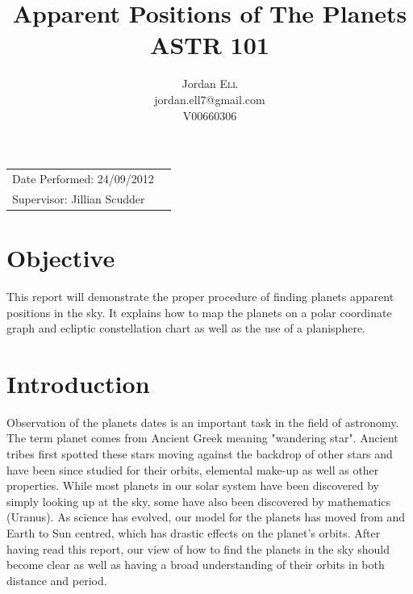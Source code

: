 \documentclass{article}
\title{Apparent Positions of The Planets \\ ASTR 101} %
\author{Jordan \textsc{Ell} \\ jordan.ell7@gmail.com \\ V00660306} %
\begin{document}
\maketitle %

\begin{tabular}{lr}
Date Performed: 24/09/2012 \\ %
Supervisor: Jillian Scudder %
\end{tabular}

\setlength\parindent{0pt} %

\renewcommand{\labelenumi}{\alph{enumi}.} %


\section{Objective}

This report will demonstrate the proper procedure of finding planets apparent positions in the sky.
It explains how to map the planets on a polar coordinate graph and ecliptic constellation chart as well as the 
use of a planisphere.\\
 

\section{Introduction}

Observation of the planets dates is an important task in the field of astronomy. The term planet comes from Ancient Greek
meaning "wandering star". Ancient tribes first spotted these stars moving against the backdrop of other stars and have been
since studied for their orbits, elemental make-up as well as other properties. While most planets in our solar system have been
discovered by simply looking up at the sky, some have also been discovered by mathematics (Uranus). As science has evolved,
our model for the planets has moved from and Earth to Sun centred, which has drastic effects on the planet's orbits. After having
read this report, our view of how to find the planets in the sky should become clear as well as having a broad understanding
of their orbits in both distance and period.
\end{document}
